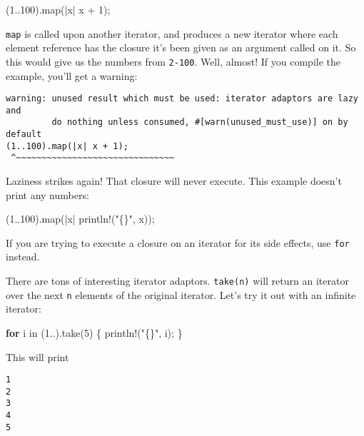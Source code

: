 \documentclass[a4paper,]{book}
\newenvironment{Shaded}{\begin{snugshade}}{\end{snugshade}}
\newcommand{\KeywordTok}[1]{\textcolor[rgb]{0.13,0.29,0.53}{\textbf{{#1}}}}
\newcommand{\DecValTok}[1]{\textcolor[rgb]{0.00,0.00,0.81}{{#1}}}
\newcommand{\StringTok}[1]{\textcolor[rgb]{0.31,0.60,0.02}{{#1}}}
\newcommand{\OtherTok}[1]{\textcolor[rgb]{0.56,0.35,0.01}{{#1}}}
\newcommand{\NormalTok}[1]{{#1}}
\begin{document}
\begin{Shaded}
\begin{Highlighting}[]
\NormalTok{(}\DecValTok{1.}\NormalTok{.}\DecValTok{100}\NormalTok{).map(|x| x + }\DecValTok{1}\NormalTok{);}
\end{Highlighting}
\end{Shaded}

\texttt{map} is called upon another iterator, and produces a new
iterator where each element reference has the closure it's been given as
an argument called on it. So this would give us the numbers from
\texttt{2-100}. Well, almost! If you compile the example, you'll get a
warning:

\begin{verbatim}
warning: unused result which must be used: iterator adaptors are lazy and
         do nothing unless consumed, #[warn(unused_must_use)] on by default
(1..100).map(|x| x + 1);
 ^~~~~~~~~~~~~~~~~~~~~~~~~~~~~~~~
\end{verbatim}

Laziness strikes again! That closure will never execute. This example
doesn't print any numbers:

\begin{Shaded}
\begin{Highlighting}[]
\NormalTok{(}\DecValTok{1.}\NormalTok{.}\DecValTok{100}\NormalTok{).map(|x| }\OtherTok{println!}\NormalTok{(}\StringTok{"\{\}"}\NormalTok{, x));}
\end{Highlighting}
\end{Shaded}

If you are trying to execute a closure on an iterator for its side
effects, use \texttt{for} instead.

There are tons of interesting iterator adaptors. \texttt{take(n)} will
return an iterator over the next \texttt{n} elements of the original
iterator. Let's try it out with an infinite iterator:

\begin{Shaded}
\begin{Highlighting}[]
\KeywordTok{for} \NormalTok{i in (}\DecValTok{1.}\NormalTok{.).take(}\DecValTok{5}\NormalTok{) \{}
    \OtherTok{println!}\NormalTok{(}\StringTok{"\{\}"}\NormalTok{, i);}
\NormalTok{\}}
\end{Highlighting}
\end{Shaded}

This will print

\begin{verbatim}
1
2
3
4
5
\end{verbatim}
\end{document}
